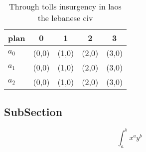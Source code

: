 \documentclass[a4paper]{article}
\begin{document}
\begin{table}
\begin{adjustbox}{width=0.5\columnwidth}
\begin{tabular}{|l|l|l|l|l|}
\hline
\textbf{plan} & \multicolumn{1}{c|}{\textbf{0}} & \multicolumn{1}{c|}{\textbf{1}} & \multicolumn{1}{c|}{\textbf{2}} & \multicolumn{1}{c|}{\textbf{3}} \\ \hline
\textbf{$a_0$}  & (0,0) & (1,0) & (2,0) & (3,0) \\ \hline
\textbf{$a_1$}  & (0,0) & (1,0) & (2,0) & (3,0) \\ \hline
\textbf{$a_2$}  & (0,0) & (1,0) & (2,0) & (3,0) \\ \hline
\end{tabular}
\end{adjustbox}
\caption{Through tolls insurgency in laos the lebanese civ
}
\end{table}

\subsection{SubSection}

\[ \int_{a}^{b}{x^{a}y^{b}} \]
\end{document}
